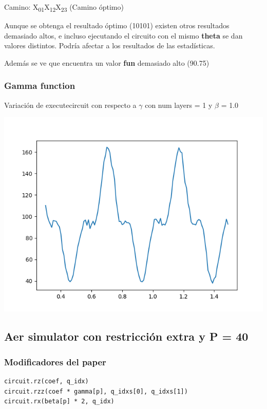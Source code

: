 \documentclass[letterpaper]{article}
\begin{document}
Camino: X\textsubscript{01}X\textsubscript{12}X\textsubscript{23} (Camino óptimo)

Aunque se obtenga el resultado óptimo (10101) existen otros resultados demasiado altos, e incluso ejecutando el circuito con el mismo \textbf{theta} se dan valores distintos. Podría afectar a los resultados de las estadísticas.

Además se ve que encuentra un valor \textbf{fun} demasiado alto (90.75)

\newpage

\subsubsection{Gamma function}
\label{sec:org676f851}
Variación de execute\textunderscore circuit con respecto a \(\gamma\) con num layers = 1 y \(\beta\) = 1.0
\begin{center}
\includegraphics[width=.9\linewidth]{../img/primer_grafo/con_restriccion_extra/primer_restr_aer_gamma_fun.png}
\end{center}

\subsection{Aer simulator con restricción extra y P = 40}
\label{sec:org0e73988}
\subsubsection{Modificadores del paper}
\label{sec:orgbeda07b}
\lstset{language=Python,label= ,caption= ,captionpos=b,numbers=none}
\begin{lstlisting}
circuit.rz(coef, q_idx)
circuit.rzz(coef * gamma[p], q_idxs[0], q_idxs[1])
circuit.rx(beta[p] * 2, q_idx)
\end{lstlisting}
\end{document}
